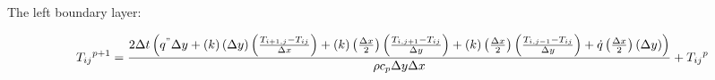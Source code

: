 The left boundary layer:
\begin{small}
\begin{equation}
\begin{gathered}
    { { T }_{ ij } }^{ p+1 }=\frac { 2\Delta t\left( { q }^{ " }\Delta y+\left( k \right) \left( \Delta y \right) \left( \frac { { T }_{ i+1,j }-{ T }_{ ij } }{ \Delta x }  \right) +\left( k \right) \left( \frac { \Delta x }{ 2 }  \right) \left( \frac { { T }_{ i,j+1 }-{ T }_{ ij } }{ \Delta y }  \right) +\left( k \right) \left( \frac { \Delta x }{ 2 }  \right) \left( \frac { { T }_{ i,j-1 }-{ T }_{ ij } }{ \Delta y }  \right) +\dot { q } \left( \frac { \Delta x }{ 2 }  \right) \left( \Delta y \right)  \right)  }{ \rho { c }_{ p }\Delta y\Delta x } +{ { T }_{ ij } }^{ p }
\end{gathered}
\end{equation}
\end{small}%
%